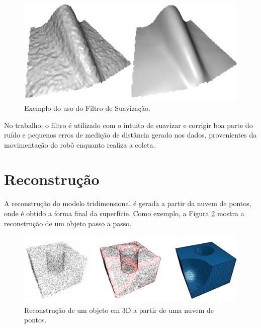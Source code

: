 \begin{figure}[H]
    \centering
    \includegraphics[scale=0.3]{dados/figuras/mls_filter.jpg}
    \caption{Exemplo do uso do Filtro de Suavização.}
    \vspace{-0.8em}
    \label{fig:smoothing_filter}
\end{figure}

No trabalho, o filtro é utilizado com o intuito de suavizar e corrigir boa parte do ruído e pequenos erros de medição de distância gerado nos dados, provenientes da movimentação do robô enquanto realiza a coleta.

\section{Reconstrução}
\label{sec:reconstrucao}

A reconstrução do modelo tridimensional é gerada a partir da nuvem de pontos, onde é obtido a forma final da superfície. 
Como exemplo, a Figura \ref{fig:reconstruction} mostra a reconstrução de um objeto passo a passo.

\begin{figure}[H]
    \centering
    \includegraphics[scale=0.8]{dados/figuras/reconstruction.png}
    \caption{Reconstrução de um objeto em 3D a partir de uma nuvem de pontos.}
    \vspace{-0.8em}
    \label{fig:reconstruction}
\end{figure}

